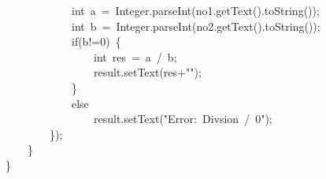 {\ttfamily\small \ \ \ \ \ \ \ \ \ \ \ \ int\ a\ =\ Integer.parseInt(no1.getText().toString());} \\
{\ttfamily\small \ \ \ \ \ \ \ \ \ \ \ \ int\ b\ =\ Integer.parseInt(no2.getText().toString());} \\
{\ttfamily\small \ \ \ \ \ \ \ \ \ \ \ \ if(b!=0)\ \{} \\
{\ttfamily\small \ \ \ \ \ \ \ \ \ \ \ \ \ \ \ \ int\ res\ =\ a\ /\ b;} \\
{\ttfamily\small \ \ \ \ \ \ \ \ \ \ \ \ \ \ \ \ result.setText(res+"");} \\
{\ttfamily\small \ \ \ \ \ \ \ \ \ \ \ \ \}} \\
{\ttfamily\small \ \ \ \ \ \ \ \ \ \ \ \ else} \\
{\ttfamily\small \ \ \ \ \ \ \ \ \ \ \ \ \ \ \ \ result.setText("Error:\ Divsion\ /\ 0");} \\
{\ttfamily\small \ \ \ \ \ \ \ \ \});} \\
{\ttfamily\small \ \ \ \ \}} \\
{\ttfamily\small \}} \\
